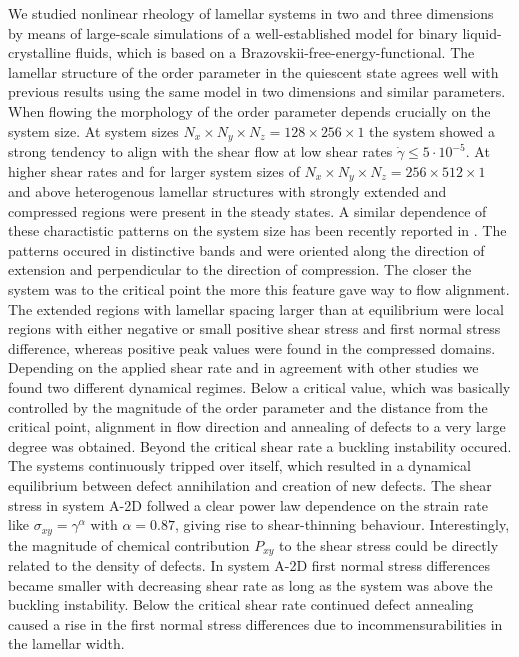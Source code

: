 \documentclass[8.5pt,twoside,twocolumn]{article}
\newcommand{\e}[1]{\cdot10^{#1}}
\newcommand{\gd}{\dot{\gamma}}
\begin{document}
We studied nonlinear rheology of lamellar systems in two and three dimensions by means of large-scale simulations of a well-established model for binary liquid-crystalline fluids, which is based on a Brazovskii-free-energy-functional.
The lamellar structure of the order parameter in the quiescent state agrees well with previous results using the same model in two dimensions and similar parameters.
When flowing the morphology of the order parameter depends crucially on the system size.
At system sizes $N_x\times N_y\times N_z=128\times256\times 1$ the system showed a strong tendency to align with the shear flow at low shear rates $\gd\le5\e{-5}$.
At higher shear rates and for larger system sizes of $N_x\times N_y\times N_z=256\times512\times 1$ and above heterogenous lamellar structures with strongly extended and compressed regions were present in the steady states.
A similar dependence of these charactistic patterns on the system size has been recently reported in \cite{Kumaran2011}.
The patterns occured in distinctive bands and were oriented along the direction of extension and perpendicular to the direction of compression.
The closer the system was to the critical point the more this feature gave way to flow alignment.
The extended regions with lamellar spacing larger than at equilibrium were local regions with either negative or small positive shear stress and first normal stress difference, whereas positive peak values were found in the compressed domains.
Depending on the applied shear rate and in agreement with other studies we found two different dynamical regimes. 
Below a critical value, which was basically controlled by the magnitude of the order parameter and the distance from the critical point, alignment in flow direction and annealing of defects to a very large degree was obtained. 
Beyond the critical shear rate a buckling instability occured.
The systems continuously tripped over itself, which resulted in a dynamical equilibrium between defect annihilation and creation of new defects.
The shear stress in system A-2D follwed a clear power law dependence on the strain rate like $\sigma_{xy}=\gamma^\alpha$ with $\alpha=0.87$, giving rise to shear-thinning behaviour.
Interestingly, the magnitude of chemical contribution $P_{xy}$ to the shear stress could be directly related to the density of defects.
In system A-2D first normal stress differences became smaller with decreasing shear rate as long as the system was above the buckling instability.
Below the critical shear rate continued defect annealing caused a rise in the first normal stress differences due to incommensurabilities in the lamellar width.\\
\end{document}
